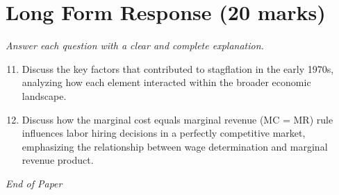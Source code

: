\documentclass[12pt]{article}
\begin{document}
\section*{Long Form Response (20 marks)}
\textit{Answer each question with a clear and complete explanation.}
\begin{enumerate}[label=\arabic*.]
\setcounter{enumi}{10}
\item Discuss the key factors that contributed to stagflation in the early 1970s, analyzing how
each element interacted within the broader economic landscape.
\item Discuss how the marginal cost equals marginal revenue (MC = MR) rule influences labor
hiring decisions in a perfectly competitive market, emphasizing the relationship between
wage determination and marginal revenue product.
\end{enumerate}

\vfill
\noindent\textit{End of Paper}
\end{document}
